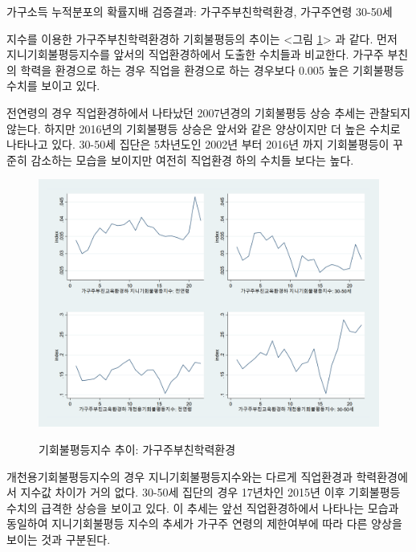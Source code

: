 \begin{table}[htbp]
    \centering
    \caption{가구소득 누적분포의 확률지배 검증결과: 가구주부친학력환경, 가구주연령 30-50세}
    
    \label{tab:klips_dom_byedu}
\end{table}

지수를 이용한 가구주부친학력환경하 기회불평등의 추이는 <그림 \ref{fig:klips_edugrp}> 과 같다.
먼저 지니기회불평등지수를 앞서의 직업환경하에서 도출한 수치들과 비교한다.
가구주 부친의 학력을 환경으로 하는 경우 직업을 환경으로 하는 경우보다 0.005 높은 기회불평등 수치를 보이고 있다.

전연령의 경우 직업환경하에서 나타났던 2007년경의 기회불평등 상승 추세는 관찰되지 않는다. 
하지만 2016년의 기회불평등 상승은 앞서와 같은 양상이지만 더 높은 수치로 나타나고 있다.
30-50세 집단은 5차년도인 2002년 부터 2016년 까지 기회불평등이 꾸준히 감소하는 모습을 보이지만 여전히 직업환경 하의 수치들 보다는 높다.

\begin{figure}
    \centering
    \caption{기회불평등지수 추이: 가구주부친학력환경}
    \includegraphics[width=\textwidth]{figure/incn1m_edugrp_index.png}
    \label{fig:klips_edugrp}
\end{figure}

개천용기회불평등지수의 경우 지니기회불평등지수와는 다르게 직업환경과 학력환경에서 지수값 차이가 거의 없다.
30-50세 집단의 경우 17년차인 2015년 이후 기회불평등 수치의 급격한 상승을 보이고 있다.
이 추세는 앞선 직업환경하에서 나타나는 모습과 동일하여 지니기회불평등 지수의 추세가 가구주 연령의 제한여부에 따라 다른 양상을 보이는 것과 구분된다.

